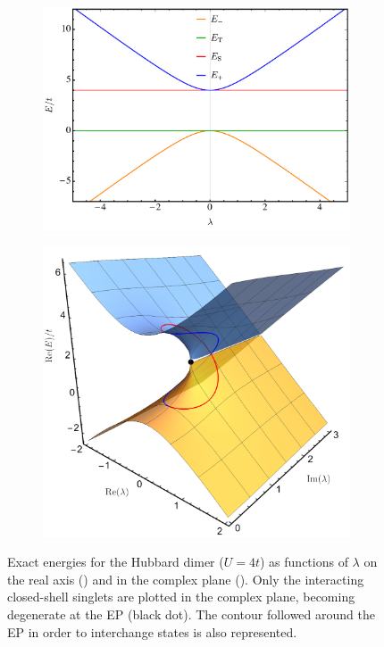 \documentclass[aps,prb,reprint,noshowkeys,linenumbers,superscriptaddress]{revtex4-1}
\begin{document}
\begin{figure}[t]
	\begin{subfigure}{0.49\textwidth}
	\includegraphics[height=0.65\textwidth]{fig1a}
	\subcaption{\label{subfig:FCI_real}}
    \end{subfigure}
	\begin{subfigure}{0.49\textwidth}
	\includegraphics[height=0.65\textwidth]{fig1b}
	\subcaption{\label{subfig:FCI_cplx}}
    \end{subfigure}
	\caption{%
	Exact energies for the Hubbard dimer ($U=4t$) as functions of $\lambda$ on the real axis () and in the complex plane ().
    Only the interacting closed-shell singlets are plotted in the complex plane, becoming degenerate at the EP (black dot).
    The contour followed around the EP in order to interchange states is also represented.
	\label{fig:FCI}}
\end{figure}
\end{document}
